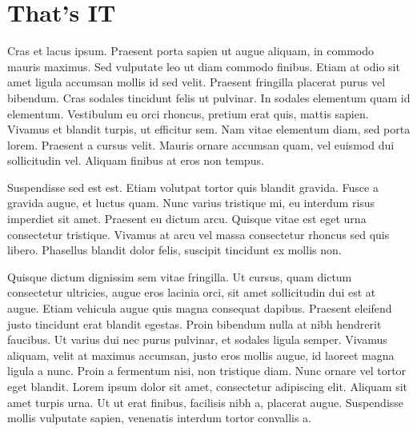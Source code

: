 \chapter{That's IT}

Cras et lacus ipsum. Praesent porta sapien ut augue aliquam, in commodo mauris maximus. Sed vulputate leo ut diam commodo finibus. Etiam at odio sit amet ligula accumsan mollis id sed velit. Praesent fringilla placerat purus vel bibendum. Cras sodales tincidunt felis ut pulvinar. In sodales elementum quam id elementum. Vestibulum eu orci rhoncus, pretium erat quis, mattis sapien. Vivamus et blandit turpis, ut efficitur sem. Nam vitae elementum diam, sed porta lorem. Praesent a cursus velit. Mauris ornare accumsan quam, vel euismod dui sollicitudin vel. Aliquam finibus at eros non tempus.

Suspendisse sed est est. Etiam volutpat tortor quis blandit gravida. Fusce a gravida augue, et luctus quam. Nunc varius tristique mi, eu interdum risus imperdiet sit amet. Praesent eu dictum arcu. Quisque vitae est eget urna consectetur tristique. Vivamus at arcu vel massa consectetur rhoncus sed quis libero. Phasellus blandit dolor felis, suscipit tincidunt ex mollis non.

Quisque dictum dignissim sem vitae fringilla. Ut cursus, quam dictum consectetur ultricies, augue eros lacinia orci, sit amet sollicitudin dui est at augue. Etiam vehicula augue quis magna consequat dapibus. Praesent eleifend justo tincidunt erat blandit egestas. Proin bibendum nulla at nibh hendrerit faucibus. Ut varius dui nec purus pulvinar, et sodales ligula semper. Vivamus aliquam, velit at maximus accumsan, justo eros mollis augue, id laoreet magna ligula a nunc. Proin a fermentum nisi, non tristique diam. Nunc ornare vel tortor eget blandit. Lorem ipsum dolor sit amet, consectetur adipiscing elit. Aliquam sit amet turpis urna. Ut ut erat finibus, facilisis nibh a, placerat augue. Suspendisse mollis vulputate sapien, venenatis interdum tortor convallis a.
